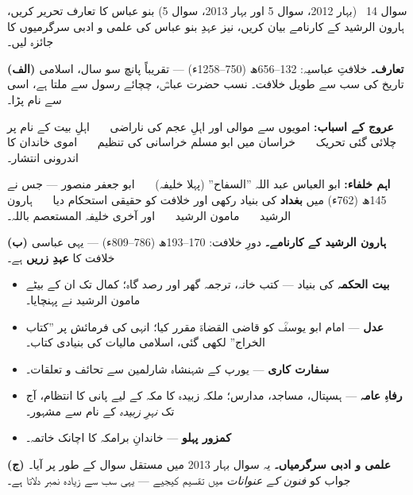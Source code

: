 \begin{sawal}{سوال \textenglish{14} \ \textnormal{\small(بہار \textenglish{2012}، سوال \textenglish{5} اور بہار \textenglish{2013}، سوال \textenglish{5})}}
بنو عباس کا تعارف تحریر کریں، ہارون الرشید کے کارنامے بیان کریں، نیز عہدِ بنو
عباس کی علمی و ادبی سرگرمیوں کا جائزہ لیں۔
\end{sawal}

\begin{hal}
\textbf{(الف) تعارف۔} خلافتِ عباسیہ: \textenglish{132--656}ھ
(\textenglish{750--1258}ء) --- تقریباً پانچ سو سال، اسلامی تاریخ کی سب سے
طویل خلافت۔ نسب حضرت عباسؓ، چچائے رسول \saw سے ملتا ہے، اسی سے نام پڑا۔

\smallskip
\textbf{عروج کے اسباب:} امویوں سے موالی اور اہلِ عجم کی ناراضی \ \textbullet\ \
اہلِ بیت کے نام پر چلائی گئی تحریک \ \textbullet\ \ خراسان میں ابو مسلم خراسانی
کی تنظیم \ \textbullet\ \ اموی خاندان کا اندرونی انتشار۔

\smallskip
\textbf{اہم خلفاء:} ابو العباس عبد اللہ ''السفاح'' (پہلا خلیفہ) \ \textbullet\ \
ابو جعفر منصور --- جس نے \textenglish{145}ھ (\textenglish{762}ء) میں
\textbf{بغداد} کی بنیاد رکھی اور خلافت کو حقیقی استحکام دیا \ \textbullet\ \
ہارون الرشید \ \textbullet\ \ مامون الرشید \ \textbullet\ \ اور آخری خلیفہ
المستعصم باللہ۔

\medskip
\textbf{(ب) ہارون الرشید کے کارنامے۔} دورِ خلافت: \textenglish{170--193}ھ
(\textenglish{786--809}ء) --- یہی عباسی خلافت کا \textbf{عہدِ زریں} ہے۔

\begin{itemize}\setlength{\itemsep}{1pt}
  \item \textbf{بیت الحکمہ} کی بنیاد --- کتب خانہ، ترجمہ گھر اور رصد گاہ؛ کمال
        تک ان کے بیٹے مامون الرشید نے پہنچایا۔
  \item \textbf{عدل} --- امام ابو یوسفؒ کو قاضی القضاۃ مقرر کیا؛ انہی کی
        فرمائش پر ''کتاب الخراج'' لکھی گئی، اسلامی مالیات کی بنیادی کتاب۔
  \item \textbf{سفارت کاری} --- یورپ کے شہنشاہ شارلمین سے تحائف و تعلقات۔
  \item \textbf{رفاہِ عامہ} --- ہسپتال، مساجد، مدارس؛ ملکہ زبیدہ کا مکہ کے لیے
        پانی کا انتظام، آج تک \emph{نہرِ زبیدہ} کے نام سے مشہور۔
  \item \textbf{کمزور پہلو} --- خاندانِ برامکہ کا اچانک خاتمہ۔
\end{itemize}

\medskip
\textbf{(ج) علمی و ادبی سرگرمیاں۔} یہ سوال بہار \textenglish{2013} میں مستقل
سوال کے طور پر آیا۔ جواب کو \emph{فنون کے عنوانات} میں تقسیم کیجیے --- یہی سب
سے زیادہ نمبر دلاتا ہے۔


\end{hal}
